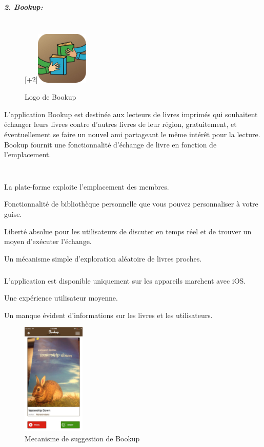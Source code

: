 \subparagraph{{\large 2. Bookup:}\\\\}

\begin{figure}
		\raisebox{0pt}[\dimexpr\height+2\baselineskip\relax]{\includegraphics[width=2.5cm]{Images/chapter1/bookUpLogo.jpg}}
		\caption{Logo de Bookup}
\end{figure}

L'application Bookup est destinée aux lecteurs de livres imprimés qui souhaitent échanger leurs livres contre d'autres livres de leur région, gratuitement, et éventuellement se faire un nouvel ami partageant le même intérêt pour la lecture. Bookup fournit une fonctionnalité d’échange de livre en fonction de l’emplacement.\\\\

\subparagraph*{}
\begin{list}{•}{\textbf{Avantages}}
	\item La plate-forme exploite l'emplacement des membres.
	\item Fonctionnalité de bibliothèque personnelle que vous pouvez personnaliser à votre guise.
	\item Liberté absolue pour les utilisateurs de discuter en temps réel et de trouver un moyen d'exécuter l'échange.
	\item Un mécanisme simple d'exploration aléatoire de livres proches.
\end{list}

\subparagraph*{}
\begin{list}{•}{\textbf{Inconvénients}}
	\item L'application est disponible uniquement sur les appareils marchent avec iOS.
	\item Une expérience utilisateur moyenne.
	\item Un manque évident d'informations sur les livres et les utilisateurs.
\end{list}

\begin{figure}[h]
	\begin{center}
		\includegraphics[width=3cm]{Images/chapter1/bookUpScreenshot.jpg}
		\caption{Mecanisme de suggestion de Bookup}
	\end{center}
\end{figure}
\newpage

